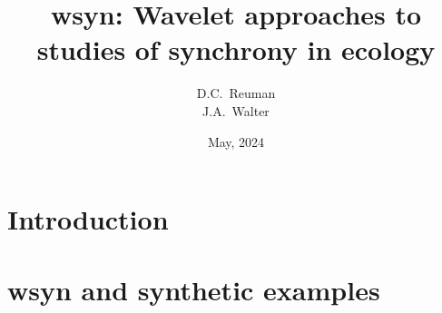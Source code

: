 \documentclass{beamer}
\title[Wavelet approaches to synchrony]
{
wsyn: Wavelet approaches to studies of synchrony in ecology
}
\author[Reuman]
{
D.C.~Reuman\inst{1} \\
J.A.~Walter\inst{2}
}
\institute
{
\inst{1}
University of Kansas \\
\inst{2}
UC Davis and University of Virginia
}
\date[KPT 2003]
{
May, 2024
}
\begin{document}
\begin{frame}
\titlepage
\end{frame}

\section{Introduction}


\section{wsyn and synthetic examples}



\end{document}
